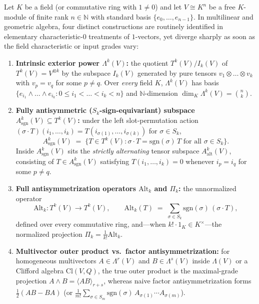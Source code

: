\documentclass[11pt,a4paper]{article}
\theoremstyle{definition}
\theoremstyle{remark}
\newcommand{\Alt}{\mathrm{Alt}}
\newcommand{\Cl}{\mathrm{Cl}}
\newcommand{\sgn}{\mathrm{sgn}}
\newcommand{\N}{\mathbb{N}}
\begin{document}
Let $K$ be a field (or commutative ring with $1 \neq 0$) and let $V \cong K^n$ be a free $K$-module of finite rank $n \in \N$ with standard basis $\{e_0, \dots, e_{n-1}\}$. In multilinear and geometric algebra, four distinct constructions are routinely identified in elementary characteristic-$0$ treatments of $1$-vectors, yet diverge sharply as soon as the field characteristic or input grades vary:
\begin{enumerate}
\item[(1)] \textbf{Intrinsic exterior power $\Lambda^k(V)$:} the quotient $T^k(V)/I_k(V)$ of $T^k(V) = V^{\otimes k}$ by the subspace $I_k(V)$ generated by pure tensors $v_1 \otimes \dots \otimes v_k$ with $v_p = v_q$ for some $p \neq q$. Over \emph{every} field $K$, $\Lambda^k(V)$ has basis $\{e_{i_1} \wedge \dots \wedge e_{i_k} : 0 \le i_1 < \dots < i_k < n\}$ and $\N$-dimension $\dim_K \Lambda^k(V) = \binom{n}{k}$.
\item[(2)] \textbf{Fully antisymmetric ($S_k$-sign-equivariant) subspace $A^k_{\sgn}(V) \subseteq T^k(V)$:} under the left slot-permutation action $(\sigma \cdot T)(i_1, \dots, i_k) = T(i_{\sigma(1)}, \dots, i_{\sigma(k)})$ for $\sigma \in S_k$,
\[
  A^k_{\sgn}(V) \;=\; \bigl\{ T \in T^k(V) : \sigma \cdot T = \sgn(\sigma)\,T \text{ for all } \sigma \in S_k \bigr\}.
\]
Inside $A^k_{\sgn}(V)$ sits the \emph{strictly alternating} tensor subspace $A^k_{\mathrm{alt}}(V)$, consisting of $T \in A^k_{\sgn}(V)$ satisfying $T(i_1, \dots, i_k) = 0$ whenever $i_p = i_q$ for some $p \neq q$.
\item[(3)] \textbf{Full antisymmetrization operators $\Alt_k$ and $\Pi_k$:} the unnormalized operator
\[
  \Alt_k : T^k(V) \longrightarrow T^k(V), \qquad \Alt_k(T) \;=\; \sum_{\sigma \in S_k} \sgn(\sigma)\,(\sigma \cdot T),
\]
defined over every commutative ring, and---when $k! \cdot 1_K \in K^\times$---the normalized projection $\Pi_k = \frac{1}{k!}\Alt_k$.
\item[(4)] \textbf{Multivector outer product vs.\ factor antisymmetrization:} for homogeneous multivectors $A \in \Lambda^r(V)$ and $B \in \Lambda^s(V)$ inside $\Lambda(V)$ or a Clifford algebra $\Cl(V, Q)$, the true outer product is the maximal-grade projection $A \wedge B = \langle A B \rangle_{r+s}$, whereas naive factor antisymmetrization forms $\frac{1}{2}(A B - B A)$ (or $\frac{1}{m!}\sum_{\sigma \in S_m}\sgn(\sigma)\,A_{\sigma(1)}\cdots A_{\sigma(m)}$).
\end{enumerate}
\end{document}
